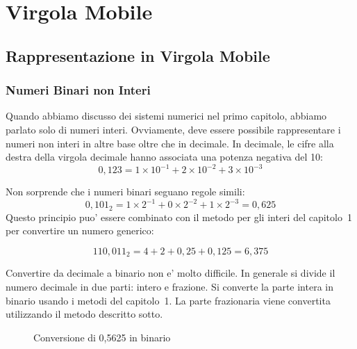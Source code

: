 \chapter{Virgola Mobile}

\section{Rappresentazione in Virgola Mobile}

\subsection{Numeri Binari non Interi}

Quando abbiamo discusso dei sistemi numerici nel primo capitolo, abbiamo 
parlato solo di numeri interi. Ovviamente, deve essere possibile rappresentare
i numeri non interi in altre base oltre che in decimale. In decimale,
le cifre alla destra della virgola decimale hanno associata una potenza
negativa del 10:
\[ 0,123 = 1 \times 10^{-1} + 2 \times 10^{-2} + 3 \times 10^{-3} \]

Non sorprende che i numeri binari seguano regole simili:
\[ 0,101_2 = 1 \times 2^{-1} + 0 \times 2^{-2} + 1 \times 2^{-3} = 0,625 \]
Questo principio puo' essere combinato con il metodo per gli interi del
capitolo~1 per convertire un numero generico:

\[ 110,011_2 = 4 + 2 + 0,25 + 0,125 = 6,375 \]

Convertire da decimale a binario non e' molto difficile. In generale si divide
il numero decimale in due parti: intero e frazione. Si converte la parte intera
in binario usando i metodi del capitolo~1. La parte frazionaria viene convertita
utilizzando il metodo descritto sotto.

\begin{figure}[t]
\centering
{}
\caption{Conversione di 0,5625 in binario\label{fig:binConvert1}}
\end{figure}

